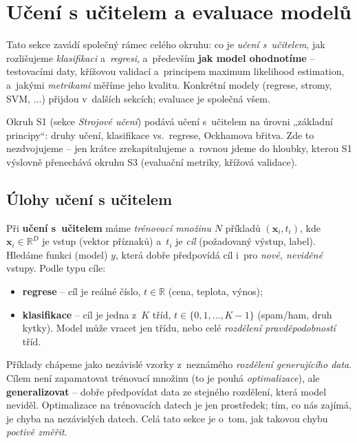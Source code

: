 \section{Učení s učitelem a evaluace modelů}\label{sec:evaluace}

Tato sekce zavádí společný rámec celého okruhu: co je \emph{učení s~učitelem}, jak rozlišujeme \emph{klasifikaci} a~\emph{regresi}, a~především \textbf{jak model ohodnotíme} -- testovacími daty, křížovou validací a~principem maximum likelihood estimation, a~jakými \emph{metrikami} měříme jeho kvalitu. Konkrétní modely (regrese, stromy, SVM, $\dots$) přijdou v~dalších sekcích; evaluace je společná všem.

\begin{poznamka}[Vztah k~S1]
Okruh S1 (sekce \emph{Strojové učení}) podává učení s~učitelem na úrovni „základní principy``: druhy učení, klasifikace vs.\ regrese, Ockhamova břitva. Zde to nezdvojujeme -- jen krátce zrekapitulujeme a~rovnou jdeme do hloubky, kterou S1 výslovně přenechává okruhu S3 (evaluační metriky, křížová validace).
\end{poznamka}

\subsection{Úlohy učení s učitelem}

\begin{definice}
Při \textbf{učení s~učitelem} máme \emph{trénovací množinu} $N$ příkladů $(\mathbf{x}_i,t_i)$, kde $\mathbf{x}_i\in\mathbb{R}^D$ je vstup (vektor příznaků) a~$t_i$ je \emph{cíl} (požadovaný výstup, label). Hledáme funkci (model) $y$, která dobře předpovídá cíl i~pro \emph{nové, neviděné} vstupy. Podle typu cíle:
\begin{itemize}
  \item \textbf{regrese} -- cíl je reálné číslo, $t\in\mathbb{R}$ (cena, teplota, výnos);
  \item \textbf{klasifikace} -- cíl je jedna z~$K$ tříd, $t\in\{0,1,\dots,K-1\}$ (spam/ham, druh kytky). Model může vracet jen třídu, nebo celé \emph{rozdělení pravděpodobností} tříd.
\end{itemize}
\end{definice}

\begin{intuice}
Příklady chápeme jako nezávislé vzorky z~neznámého \emph{rozdělení generujícího data}. Cílem není zapamatovat trénovací množinu (to je pouhá \emph{optimalizace}), ale \textbf{generalizovat} -- dobře předpovídat data ze stejného rozdělení, která model neviděl. Optimalizace na trénovacích datech je jen prostředek; tím, co nás zajímá, je chyba na nezávislých datech. Celá tato sekce je o~tom, jak takovou chybu \emph{poctivě změřit}.
\end{intuice}

